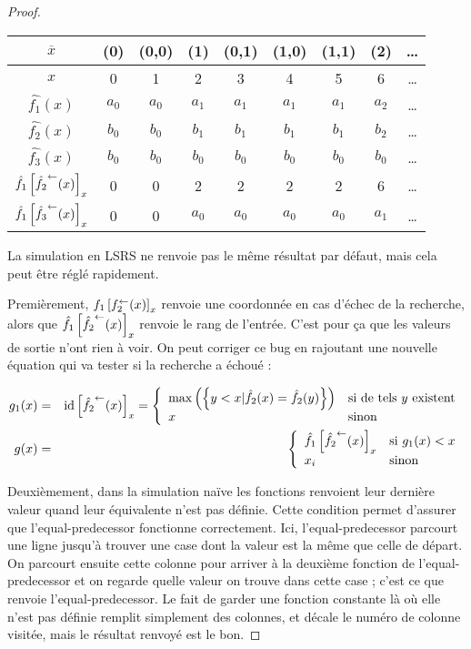 \begin{proof}
		\espace 
		
		\begin{center}
			\begin{tabular}{|c|cccccccc|}
				\hline
				$\overline{x}$			& (0)	& (0,0)	& (1)	& (0,1)	& (1,0)	& (1,1)	& (2)	& \dots \\
				\hline
				$x$					& 0 	& 1	 	& 2		& 3 	& 4 	& 5 	& 6 	& \dots \\
				\hline 
				$\hat{f_1}(x)$
									& $a_0$	& $a_0$	& $a_1$	& $a_1$	& $a_1$	& $a_1$	& $a_2$	& \dots \\
				$\hat{f_2}(x)$ 		
									& $b_0$	& $b_0$	& $b_1$	& $b_1$	& $b_1$	& $b_1$	& $b_2$	& \dots \\
				$\hat{f_3}(x)$ 		
									& $b_0$	& $b_0$	& $b_0$	& $b_0$	& $b_0$	& $b_0$	& $b_0$	& \dots \\
				$\hat{f_1}\left[ \hat{f_2}^{\leftarrow}(x) \right]_{x}$
									& 0		& 0		& 2		& 2		& 2		& 2		& 6		& \dots \\
				$\hat{f_1}\left[ \hat{f_3}^{\leftarrow}(x) \right]_{x}$
									& 0		& 0		& $a_0$ & $a_0$	& $a_0$	& $a_0$	& $a_1$	& \dots \\
				\hline
			\end{tabular}
		\end{center}
				
		La simulation en LSRS ne renvoie pas le même résultat par défaut, mais cela peut être réglé rapidement.
				
		Premièrement, $f_1\left[ f_2^{\leftarrow}(x) \right]_{x}$ renvoie une coordonnée en cas d'échec de la recherche, alors que $\hat{f_1}\left[ \hat{f_2}^{\leftarrow}(x) \right]_{x}$ renvoie le rang de l'entrée. C'est pour ça que les valeurs de sortie n'ont rien à voir. On peut corriger ce bug en rajoutant une nouvelle équation qui va tester si la recherche a échoué :
		
		\begin{eqnarray}
		g_1(x) 	& = 	& \text{id}\left[ \hat{f_2}^{\leftarrow}(x) \right]_{x} = \left\lbrace \begin{array}{ll} 
			\max\left( \left\lbrace y<x | \hat{f_2}(x) = \hat{f_2}(y) \right\rbrace \right) & \text{si de tels $y$ existent}\\
			x		& \text{sinon}
		 \end{array} \right. \\
		g(x) & = & \left\lbrace \begin{array}{ll} 
			\hat{f_1}\left[ \hat{f_2}^{\leftarrow}(x) \right]_{x} & \text{si $g_1(x) < x$}\\
			x_i		& \text{sinon}
		 \end{array} \right.
		\end{eqnarray}
		
		Deuxièmement, dans la simulation naïve les fonctions renvoient leur dernière valeur quand leur équivalente n'est pas définie. Cette condition permet d'assurer que l'equal-predecessor fonctionne correctement. Ici, l'equal-predecessor parcourt une ligne jusqu'à trouver une case dont la valeur est la même que celle de départ. On parcourt ensuite cette colonne pour arriver à la deuxième fonction de l'equal-predecessor et on regarde quelle valeur on trouve dans cette case ; c'est ce que renvoie l'equal-predecessor. Le fait de garder une fonction constante là où elle n'est pas définie remplit simplement des colonnes, et décale le numéro de colonne visitée, mais le résultat renvoyé est le bon. 
		

\end{proof}
